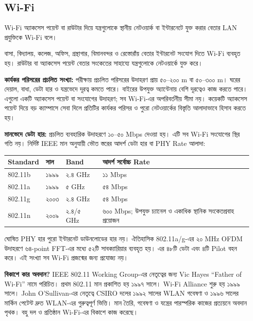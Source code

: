\subsection{Wi-Fi}
\label{ch2:wifi-numeric}

\begin{definitionbox}{Wi-Fi}
অ্যাকসেস পয়েন্ট বা রাউটার দিয়ে যন্ত্রগুলোকে স্থানীয় নেটওয়ার্ক বা ইন্টারনেটে যুক্ত করার বেতার LAN প্রযুক্তিকে Wi-Fi বলে।
\end{definitionbox}

বাসা, বিদ্যালয়, কলেজ, অফিস, গ্রন্থাগার, বিমানবন্দর ও রেস্তোরাঁয় বেতার ইন্টারনেট সংযোগ দিতে Wi-Fi ব্যবহৃত হয়। রাউটার বা অ্যাকসেস পয়েন্ট বেতার সংকেতের সাহায্যে যন্ত্রগুলোকে নেটওয়ার্কে যুক্ত করে।

\textbf{কার্যকর পরিসরের প্রচলিত সংখ্যা:} পরীক্ষায় প্রচলিত পরিসরের উদাহরণ প্রায় ৫০--২০০ m বা ৫০--৩০০ m। ঘরের দেয়াল, বাধা, ডেটা হার ও যন্ত্রভেদে দূরত্ব কমতে পারে। বাইরের উপযুক্ত অ্যান্টেনায় বেশি দূরত্বেও কাজ করতে পারে। এগুলো একটি অ্যাকসেস পয়েন্ট বা সংযোগের উদাহরণ; সব Wi-Fi-এর অপরিবর্তনীয় সীমা নয়। কয়েকটি অ্যাকসেস পয়েন্ট দিয়ে বড় ক্যাম্পাসে সেবা দিলে প্রতিটির কার্যকর পরিসর ও পুরো নেটওয়ার্কের বিস্তৃতি আলাদাভাবে হিসাব করতে হয়।

\textbf{মানভেদে ডেটা হার:} প্রচলিত ব্যবহারিক উদাহরণে ১০--৫০ Mbps দেওয়া হয়। এটি সব Wi-Fi সংযোগের স্থির গতি নয়। নির্দিষ্ট IEEE মান অনুযায়ী ভৌত স্তরের আদর্শ ডেটা হার বা PHY Rate আলাদা:
\begin{tabularx}{\linewidth}{|p{.20\linewidth}|p{.13\linewidth}|X|X|}\hline
\textbf{Standard} & \textbf{সাল} & \textbf{Band} & \textbf{আদর্শ সর্বোচ্চ Rate}\\\hline
802.11b & ১৯৯৯ & ২.৪ GHz & ১১ Mbps\\\hline
802.11a & ১৯৯৯ & ৫ GHz & ৫৪ Mbps\\\hline
802.11g & ২০০৩ & ২.৪ GHz & ৫৪ Mbps\\\hline
802.11n & ২০০৯ & ২.৪/৫ GHz & ৬০০ Mbps; উপযুক্ত চ্যানেল ও একাধিক স্থানিক সংকেতপ্রবাহ প্রয়োজন\\\hline
\end{tabularx}
ঘোষিত PHY হার পুরো ইন্টারনেট ডাউনলোডের হার নয়। ঐতিহাসিক 802.11a/g-এর ২০ MHz OFDM উদাহরণে ৬৪-point FFT-এর মধ্যে ৫২টি সাবক্যারিয়ার ব্যবহৃত হয়। এর ৪৮টি ডেটা এবং ৪টি Pilot বহন করে। এই সংখ্যা সব Wi-Fi প্রজন্মের জন্য প্রযোজ্য নয়।

\textbf{বিকাশে কার অবদান?} IEEE 802.11 Working Group-এর নেতৃত্বের জন্য Vic Hayes ``Father of Wi-Fi'' নামে পরিচিত। প্রথম 802.11 মান প্রকাশিত হয় ১৯৯৭ সালে। Wi-Fi Alliance শুরু হয় ১৯৯৯ সালে। John O'Sullivan-এর নেতৃত্বে CSIRO দলের ১৯৯২ সালের WLAN গবেষণা ও ১৯৯৬ সালের মার্কিন পেটেন্ট দ্রুত WLAN-এর গুরুত্বপূর্ণ ভিত্তি। মান তৈরি, গবেষণা ও যন্ত্রের পারস্পরিক কাজের প্রত্যয়নে অবদান পৃথক। বহু দল ও প্রতিষ্ঠান Wi-Fi-এর বিকাশে কাজ করেছে।

